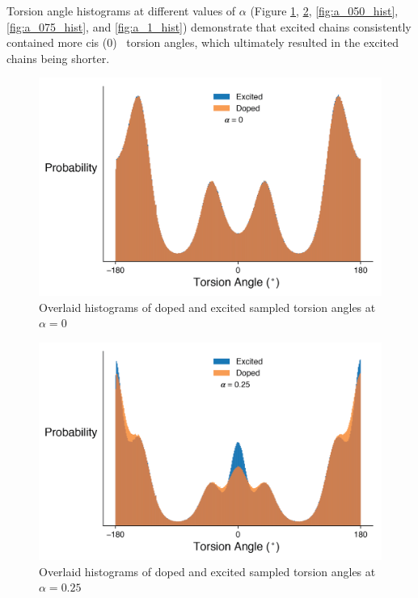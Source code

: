 Torsion angle histograms at different values of $\alpha$ (Figure \ref{fig:a_0_hist}, \ref{fig:a_025_hist}, \ref{fig:a_050_hist}, \ref{fig:a_075_hist}, and \ref{fig:a_1_hist}) demonstrate that excited chains consistently contained more cis (0\textdegree) \ torsion angles, which ultimately resulted in the excited chains being shorter.

\begin{figure}[hbt!]
    \centering
    \includegraphics{figures/append_tor_model/a_0_hist.png}
    \caption{Overlaid histograms of doped and excited sampled torsion angles at $\alpha = 0$}
    \label{fig:a_0_hist}
\end{figure}

\begin{figure}[hbt!]
    \centering
    \includegraphics{figures/append_tor_model/a_025_hist.png}
    \caption{Overlaid histograms of doped and excited sampled torsion angles at $\alpha = 0.25$}
    \label{fig:a_025_hist}
\end{figure}

